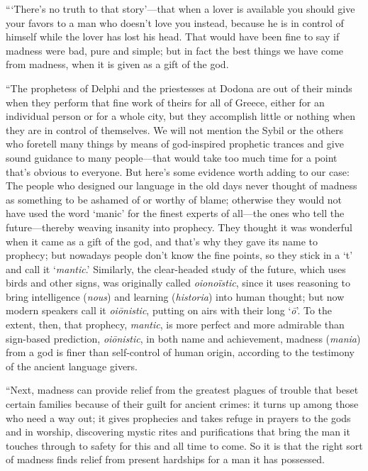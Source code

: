 “‘There's no truth to that story'---that when a lover is available you
should give your favors to a man who doesn't love you instead, because
he is in control of himself while the lover has lost his head. That
would have been fine to say if madness were bad, pure and simple; but in
fact the best things we have come from madness, when it is given as a
gift of the god.

“The prophetess of Delphi and the priestesses at Dodona are out
of their minds when they perform that fine work of theirs for all of
Greece, either for an individual person or for a whole city, but they
accomplish little or nothing when they are in control of themselves. We
will not mention the Sybil or the others who foretell many things by
means of god-inspired prophetic trances and give sound guidance to many
people---that would take too much time for a point that's obvious to
everyone. But here's some evidence worth adding to our case: The people
who designed our language in the old days never thought of madness as
something to be ashamed of or worthy of blame; otherwise they would not
have used the word ‘manic' for the finest experts of all---the ones who
tell the future---thereby weaving insanity into prophecy. They
thought it was wonderful when it came as a gift of the god, and that's
why they gave its name to prophecy; but nowadays people don't know the
fine points, so they stick in a ‘t' and call it ‘{\em mantic}.'
Similarly, the clear-headed study of the future, which uses birds and
other signs, was originally called {\em oionoïstic}, since it uses
reasoning to bring intelligence ({\em nous}) and learning
({\em historia}) into human thought; but now modern speakers call it
{\em oiōnistic}, putting on airs with their long ‘{\em ō}'. To
the extent, then, that prophecy, {\em mantic}, is more perfect and more
admirable than sign-based prediction, {\em oiōnistic}, in both name and
achievement, madness ({\em mania}) from a god is finer than self-control
of human origin, according to the testimony of the ancient language
givers.

“Next, madness can provide relief from the greatest plagues of trouble
that beset certain families because of their guilt for ancient crimes:
it turns up among those who need a way out; it gives prophecies and
takes refuge in prayers to the gods and in worship, discovering
mystic rites and purifications that bring the man it
touches through to
safety for this and all time to come. So it is that the right sort of
madness finds relief from present hardships for a man it has possessed.

